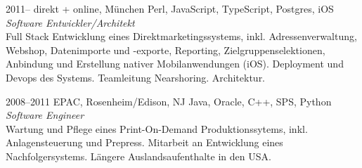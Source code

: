 \documentclass[]{friggeri-cv-a4}
\begin{document}

\begin{entrylist}
\entry
{2011--}
{direkt + online, München}
{Perl, JavaScript, TypeScript, Postgres, iOS}
{\emph{Software Entwickler/Architekt} \\
Full Stack Entwicklung eines Direktmarketingssystems, inkl. Adressenverwaltung, Webshop, Datenimporte und -exporte, Reporting, Zielgruppenselektionen, Anbindung und Erstellung nativer Mobilanwendungen (iOS). Deployment und Devops des Systems. Teamleitung Nearshoring. Architektur.}
\end{entrylist}


\begin{entrylist}
\entry
{2008--2011}
{EPAC, Rosenheim/Edison, NJ}
{Java, Oracle, C++, SPS, Python}
{\emph{Software Engineer} \\
Wartung und Pflege eines Print-On-Demand Produktionssytems, inkl. Anlagensteuerung und Prepress. Mitarbeit an Entwicklung eines Nachfolgersystems. Längere Auslandsaufenthalte in den USA.}
\end{entrylist}
\end{document}
